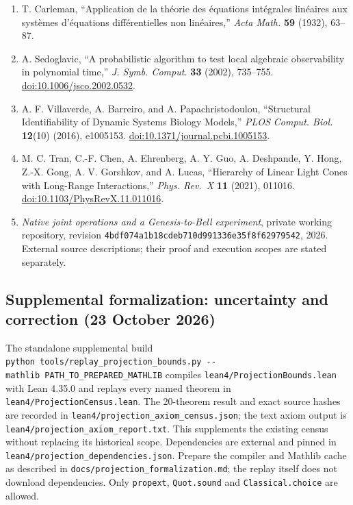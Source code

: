 \documentclass[
  11pt,
]{article}
\begin{document}
\begin{enumerate}
\item
  T. Carleman, ``Application de la théorie des équations intégrales linéaires aux systèmes d'équations différentielles non linéaires,'' \emph{Acta Math.} \textbf{59} (1932), 63--87.
\item
  A. Sedoglavic, ``A probabilistic algorithm to test local algebraic observability in polynomial time,'' \emph{J. Symb. Comput.} \textbf{33} (2002), 735--755. \href{https://doi.org/10.1006/jsco.2002.0532}{doi:10.1006/jsco.2002.0532}.
\item
  A. F. Villaverde, A. Barreiro, and A. Papachristodoulou, ``Structural Identifiability of Dynamic Systems Biology Models,'' \emph{PLOS Comput. Biol.} \textbf{12}(10) (2016), e1005153. \href{https://doi.org/10.1371/journal.pcbi.1005153}{doi:10.1371/journal.pcbi.1005153}.
\item
  M. C. Tran, C.-F. Chen, A. Ehrenberg, A. Y. Guo, A. Deshpande, Y. Hong, Z.-X. Gong, A. V. Gorshkov, and A. Lucas, ``Hierarchy of Linear Light Cones with Long-Range Interactions,'' \emph{Phys. Rev.~X} \textbf{11} (2021), 011016. \href{https://doi.org/10.1103/PhysRevX.11.011016}{doi:10.1103/PhysRevX.11.011016}.
\item
  \emph{Native joint operations and a Genesis-to-Bell experiment}, private working repository, revision \texttt{4bdf074a1b18cdeb710d991336e35f8f62979542}, 2026. External source descriptions; their proof and execution scopes are stated separately.
\end{enumerate}

\subsection{Supplemental formalization: uncertainty and correction (23 October 2026)}\label{supplemental-formalization-uncertainty-and-correction-23-october-2026}

The standalone supplemental build \texttt{python\ tools/replay\_projection\_bounds.py\ -\/-mathlib\ PATH\_TO\_PREPARED\_MATHLIB}
compiles \texttt{lean4/ProjectionBounds.lean} with Lean 4.35.0 and replays every named
theorem in \texttt{lean4/ProjectionCensus.lean}. The 20-theorem result and exact source
hashes are recorded in \texttt{lean4/projection\_axiom\_census.json}; the text axiom
output is \texttt{lean4/projection\_axiom\_report.txt}. This supplements the existing
census without replacing its historical scope. Dependencies are external and pinned in \texttt{lean4/projection\_dependencies.json}.
Prepare the compiler and Mathlib cache as described in
\texttt{docs/projection\_formalization.md}; the replay itself does not download dependencies. Only \texttt{propext}, \texttt{Quot.sound} and \texttt{Classical.choice} are allowed.
\end{document}
